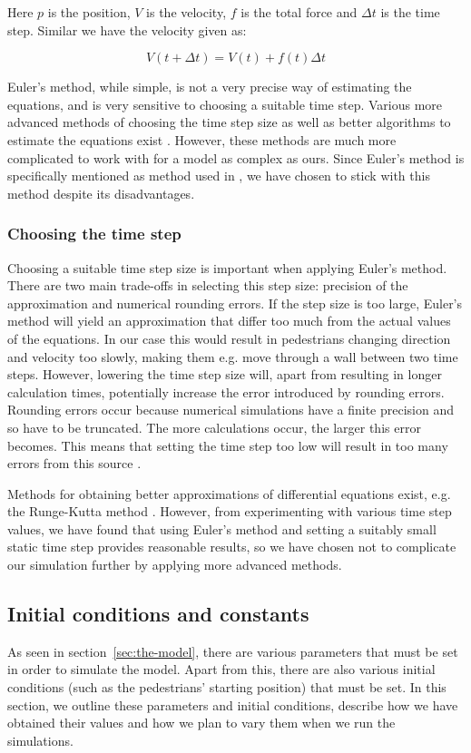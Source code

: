 Here $p$ is the position, $V$ is the velocity, $f$ is the total force and $\Delta t$ 
is the time step. Similar we have the velocity given as:

\begin{equation}
    V(t+\Delta t)=V(t)+f(t)\Delta t
\end{equation}    

Euler's method, while simple, is not a very precise way of estimating the 
equations, and is very sensitive to choosing a suitable time step. Various 
more advanced methods of choosing the time step size as well as better 
algorithms to estimate the equations exist \cite{MD}. However, these methods 
are much more complicated to work with for a model as complex as ours. Since 
Euler's method is specifically mentioned as method used in \cite{ABconstant}, 
we have chosen to stick with this method despite its disadvantages.

\subsubsection{Choosing the time step}
\label{sec:choosing-timestep}
Choosing a suitable time step size is important when applying Euler's method.  
There are two main trade-offs in selecting this step size: precision of the 
approximation and numerical rounding errors. If the step size is too large, 
Euler's method will yield an approximation that differ too much from the 
actual values of the equations. In our case this would result in pedestrians 
changing direction and velocity too slowly, making them e.g. move through a 
wall between two time steps. However, lowering the time step size will, apart 
from resulting in longer calculation times, potentially increase the error 
introduced by rounding errors. Rounding errors occur because numerical 
simulations have a finite precision and so have to be truncated. The more 
calculations occur, the larger this error becomes. This means that setting the 
time step too low will result in too many errors from this source \cite{RoundingError}.

Methods for obtaining better approximations of differential equations exist, 
e.g. the Runge-Kutta method \cite{butcher2003}. However, from experimenting 
with various time step values, we have found that using Euler's method and 
setting a suitably small static time step provides reasonable results, so we 
have chosen not to complicate our simulation further by applying more advanced 
methods.

\subsection{Initial conditions and constants}
\label{sec:init-cond}
As seen in section~\ref{sec:the-model}, there are various parameters that must 
be set in order to simulate the model. Apart from this, there are also various 
initial conditions (such as the pedestrians' starting position) that must be 
set. In this section, we outline these parameters and initial conditions, 
describe how we have obtained their values and how we plan to vary them 
when we run the simulations.

